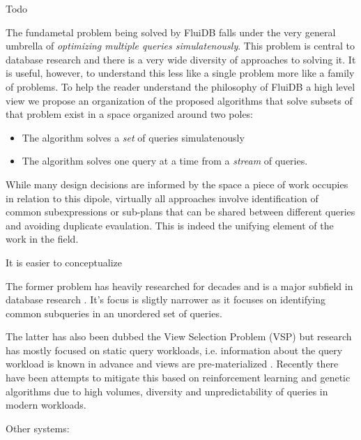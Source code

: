 
\begin{summary}
\item Todo
\end{summary}

The fundametal problem being solved by FluiDB falls under the very
general umbrella of \emph{optimizing multiple queries simulatenously}. This
problem is central to database research and there is a very wide
diversity of approaches to solving it. It is useful, however, to
understand this less like a single problem more like a family of
problems. To help the reader understand the philosophy of FluiDB a
high level view we propose an organization of the proposed algorithms
that solve subsets of that problem exist in a space organized around
two poles:

\begin{itemize}
\item The algorithm solves a \emph{set} of queries simulatenously
\item The algorithm solves one query at a time from a \emph{stream} of queries.
\end{itemize}

While many design decisions are informed by the space a piece of work
occupies in relation to this dipole, virtually all approaches involve
identification of common subexpressions or sub-plans that can be
shared between different queries and avoiding duplicate
evaulation. This is indeed the unifying element of the work in the
field.

It is easier to conceptualize

The former problem has heavily researched for decades and is a major
 subfield in database research
 \cite{sellisMultipleQueryOptimization1987,royEfficientExtensibleAlgorithms2000,ComputingQueriesDerived}. It's
 focus is sligtly narrower as it focuses on identifying common
 subqueries in an unordered set of queries.

The latter has also been dubbed the View Selection Problem (VSP) but
research has mostly focused on static query workloads,
i.e. information about the query workload is known in advance and
views are pre-materialized
\cite{phanDynamicMaterializationQuery2008a}. Recently there have been
attempts to mitigate this based on reinforcement learning and genetic
algorithms due to high volumes, diversity and unpredictability of
queries in modern workloads.

Other systems:

